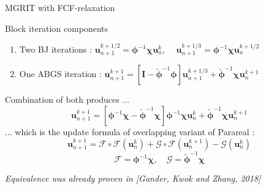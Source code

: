 \documentclass[11pt,aspectratio=43]{beamer}
\newcommand{\matr}[1]{\mathbf{#1}}
\newcommand{\vect}[1]{\boldsymbol{#1}}
\newcommand{\uvect}{\vect{u}}
\newcommand{\phiApprox}{\bm{\tilde{\phi}}}
\begin{document}
\begin{frame}{MGRIT with FCF-relaxation}
	\begin{block}{Block iteration components}
		\begin{enumerate}
			\item Two BJ iterations : $\uvect_{n+1}^{k+1/2} = \bm{\phi}^{-1}\bm{\chi} \uvect_{n}^k$, 
			$\quad\uvect_{n+1}^{k+1/3} = \bm{\phi}^{-1}\bm{\chi} \uvect_{n}^{k+1/2}$
			\item One ABGS iteration : $\uvect_{n+1}^{k+1} = [\matr{I} - \bm{\phiApprox}^{-1}\bm{\phi}]\uvect_{n+1}^{k+1/3} + \bm{\phiApprox}^{-1}\bm{\chi} \uvect_{n}^{k+1}$
		\end{enumerate}
	\end{block}
	\vskip10pt
	Combination of both produces ...
	$$\uvect_{n+1}^{k+1} = [\bm{\phi}^{-1}\bm{\chi} - \bm{\phiApprox}^{-1}\bm{\chi}]\bm{\phi}^{-1}\bm{\chi}\uvect_{n}^k 
	+ \bm{\phiApprox}^{-1}\bm{\chi} \uvect_{n}^{k+1}$$
	... which is the update formula of overlapping variant of Parareal :
	$$\uvect_{n+1}^{k+1} = \mathcal{F}\circ\mathcal{F}(\uvect_{n}^k) + \mathcal{G}\circ\mathcal{F}(\uvect_{n}^{k+1}) - \mathcal{G}(\uvect_{n}^{k})$$
	$$ \mathcal{F} = \bm{\phi}^{-1}\bm{\chi}, \quad \mathcal{G} = \bm{\phiApprox}^{-1}\bm{\chi}$$
	\begin{center}
		\textit{Equivalence was already proven in [Gander, Kwok and Zhang, 2018]}
	\end{center}
\end{frame}
\end{document}
